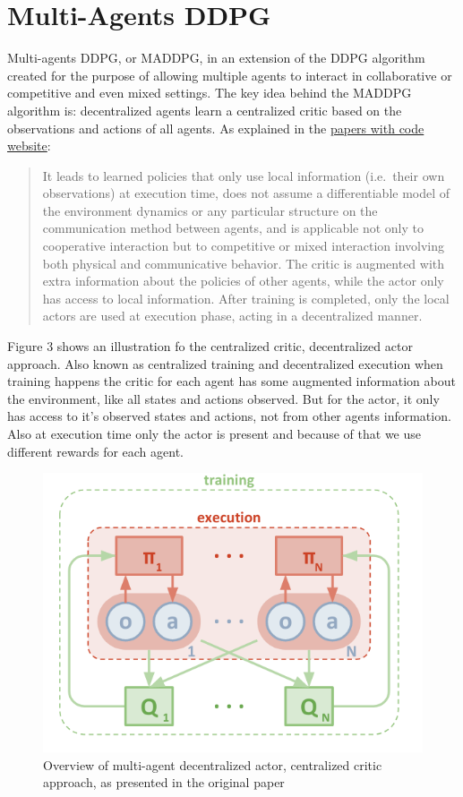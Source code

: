 \documentclass[
]{article}
\begin{document}
\hypertarget{multi-agents-ddpg}{%
\section{Multi-Agents DDPG}\label{multi-agents-ddpg}}

Multi-agents DDPG, or MADDPG, in an extension of the DDPG algorithm
created for the purpose of allowing multiple agents to interact in
collaborative or competitive and even mixed settings. The key idea
behind the MADDPG algorithm is: decentralized agents learn a centralized
critic based on the observations and actions of all agents. As explained
in the \href{https://paperswithcode.com/method/maddpg}{papers with code
website}:

\begin{quote}
It leads to learned policies that only use local information (i.e.~their
own observations) at execution time, does not assume a differentiable
model of the environment dynamics or any particular structure on the
communication method between agents, and is applicable not only to
cooperative interaction but to competitive or mixed interaction
involving both physical and communicative behavior. The critic is
augmented with extra information about the policies of other agents,
while the actor only has access to local information. After training is
completed, only the local actors are used at execution phase, acting in
a decentralized manner.
\end{quote}

Figure 3 shows an illustration fo the centralized critic, decentralized
actor approach. Also known as centralized training and decentralized
execution when training happens the critic for each agent has some
augmented information about the environment, like all states and actions
observed. But for the actor, it only has access to it's observed states
and actions, not from other agents information. Also at execution time
only the actor is present and because of that we use different rewards
for each agent.

\begin{figure}
\centering
\includegraphics{imgs/maddpg_explanation.png}
\caption{Overview of multi-agent decentralized actor, centralized critic
approach, as presented in the original paper}
\end{figure}
\end{document}
